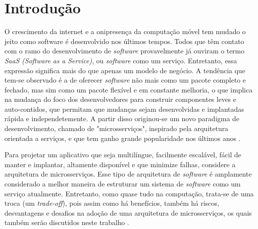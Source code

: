 \chapter{Introdução}\label{chapter-introducao}

O crescimento da internet e a onipresença da computação móvel tem mudado o jeito como software é desenvolvido nos últimos tempos. Todos que têm contato com o ramo do desenvolvimento de \emph{software} provavelmente já ouviram o termo \emph{SaaS (Software as a Service)}, ou \emph{software} como um serviço. Entretanto, essa expressão significa mais do que apenas um modelo de negócio. A tendência que tem-se observado é a de oferecer \emph{software} não mais como um pacote completo e fechado, mas sim como um pacote flexível e em constante melhoria, o que implica na mudança do foco dos desenvolvedores para construir componentes leves e auto-contidos, que permitam que mudanças sejam desenvolvidas e implantadas rápida e independetemente. A partir disso originou-se um novo paradigma de desenvolvimento, chamado de "microsserviços", inspirado pela arquitetura orientada a serviços, e que tem ganho grande popularidade nos últimos anos \cite{middleware-microservices,design-monitoring-testing-waseem}.

Para projetar um aplicativo que seja multilíngue, facilmente escalável, fácil de manter e implantar, altamente disponível e que minimize falhas, considere a arquitetura de microsserviços. Esse tipo de arquitetura de \emph{software} é amplamente considerado a melhor maneira de estruturar um sistema de \emph{software} como um serviço atualmente. Entretanto, como quase tudo na computação, trata-se de uma troca (um \emph{trade-off}), pois assim como há benefícios, também há riscos, desvantagens e desafios na adoção de uma arquitetura de microsserviços, os quais também serão discutidos neste trabalho \cite{CAOPLE, oracle_microservices}.



